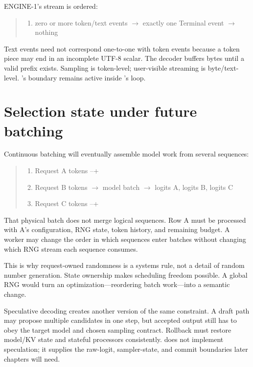 ENGINE-1's stream is ordered:

\begin{quote}
\begin{enumerate}
\item zero or more token/text events  \(\longrightarrow\)  exactly one Terminal event  \(\longrightarrow\)  nothing
\end{enumerate}
\end{quote}

Text events need not correspond one-to-one with token events because a
token piece may end in an incomplete UTF-8 scalar. The decoder buffers
bytes until a valid prefix exists. Sampling is token-level; user-visible
streaming is byte/text-level. 's boundary remains active inside
's loop.

\section{Selection state under future
batching}\label{selection-state-under-future-batching}

Continuous batching will eventually assemble model work from several
sequences:

\begin{quote}
\begin{enumerate}
\item Request A tokens --+
\item Request B tokens  \(\longrightarrow\)  model batch  \(\longrightarrow\)  logits A, logits B, logits C
\item Request C tokens --+
\end{enumerate}
\end{quote}

That physical batch does not merge logical sequences. Row A must be
processed with A's configuration, RNG state, token history, and
remaining budget. A worker may change the order in which sequences enter
batches without changing which RNG stream each sequence consumes.

This is why request-owned randomness is a systems rule, not a detail of
random number generation. State ownership makes scheduling freedom
possible. A global RNG would turn an optimization---reordering batch
work---into a semantic change.

Speculative decoding creates another version of the same constraint. A
draft path may propose multiple candidates in one step, but accepted
output still has to obey the target model and chosen sampling contract.
Rollback must restore model/KV state and stateful processors
consistently.  does not implement speculation; it supplies the
raw-logit, sampler-state, and commit boundaries later chapters will
need.

